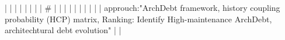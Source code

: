 |    |            |      |                                                                      |                                                                                                                                                                          |                                                                                                                                                                                                                                                            |                                                                                                                                                                                                                                                                      |  #                                                                                                                                                                                                                                                                                                       |                                                                                                                                                                                                                                                                                                                                                                                                                                                                                              |
|    |            |      |                                                                      |                                                                                                                                                                          |                                                                                                                                                                                                                                                            |                                                                                                                                                                                                                                                                      |  approuch:"ArchDebt framework, history coupling probability (HCP) matrix, Ranking: Identify High-maintenance ArchDebt, architechtural debt evolution"                                                                                                                                                    |                                                                                                                                                                                                                                                                                                                                                                                                                                                                                              |
